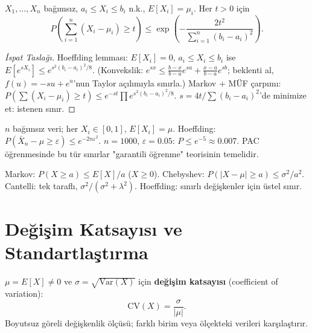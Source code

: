 \begin{teorem}
\label{thm:hoeffding}
$X_1, \ldots, X_n$ bağımsız, $a_i \leq X_i \leq b_i$ n.k., $E[X_i] = \mu_i$.
Her $t > 0$ için
\[
  P\!\left(\sum_{i=1}^n (X_i - \mu_i) \geq t\right) \leq \exp\!\left(-\frac{2t^2}{\sum_{i=1}^n(b_i-a_i)^2}\right).
\]
\end{teorem}

\begin{proof}[İspat Taslağı]
Hoeffding lemması: $E[X_i] = 0$, $a_i \leq X_i \leq b_i$ ise
$E[e^{sX_i}] \leq e^{s^2(b_i-a_i)^2/8}$.
(Konvekslik: $e^{sx} \leq \frac{b-x}{b-a}e^{sa} + \frac{x-a}{b-a}e^{sb}$;
beklenti al, $f(u) = -su + e^u$'nun Taylor açılımıyla sınırla.)
Markov + MÜF çarpımı: $P(\sum(X_i-\mu_i)\geq t) \leq e^{-st}\prod e^{s^2(b_i-a_i)^2/8}$.
$s = 4t/\sum(b_i-a_i)^2$'de minimize et: istenen sınır.
\end{proof}

\begin{ornek}
$n$ bağımsız veri; her $X_i \in [0,1]$, $E[X_i] = \mu$.
Hoeffding: $P(\bar{X}_n - \mu \geq \varepsilon) \leq e^{-2n\varepsilon^2}$.
$n = 1000$, $\varepsilon = 0.05$: $P \leq e^{-5} \approx 0.007$.
PAC öğrenmesinde bu tür sınırlar "garantili öğrenme" teorisinin temelidir.
\end{ornek}

\begin{mikroozet}
Markov: $P(X \geq a) \leq E[X]/a$ ($X \geq 0$).
Chebyshev: $P(|X-\mu|\geq a) \leq \sigma^2/a^2$.
Cantelli: tek taraflı, $\sigma^2/(\sigma^2+\lambda^2)$.
Hoeffding: sınırlı değişkenler için üstel sınır.
\end{mikroozet}

\section{Değişim Katsayısı ve Standartlaştırma}
\label{sec:degisim_katsayisi}

\begin{tanim}
\label{def:degisim_katsayisi}
$\mu = E[X] \neq 0$ ve $\sigma = \sqrt{\mathrm{Var}(X)}$ için
\textbf{değişim katsayısı} (coefficient of variation):
\[
  \mathrm{CV}(X) = \frac{\sigma}{|\mu|}.
\]
Boyutsuz göreli değişkenlik ölçüsü; farklı birim veya ölçekteki verileri karşılaştırır.
\end{tanim}

